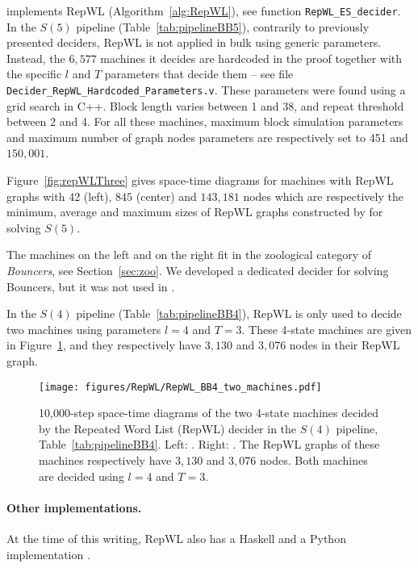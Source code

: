 

\CoqBB implements RepWL (Algorithm~\ref{alg:RepWL}), see function \texttt{RepWL\_ES\_decider}. In the $S(5)$ pipeline (Table~\ref{tab:pipelineBB5}), contrarily to previously presented deciders, RepWL is not applied in bulk using generic parameters. Instead, the ${6,577}$ machines it decides are hardcoded in the proof together with the specific $l$ and $T$ parameters that decide them -- see file \texttt{Decider\_RepWL\_Hardcoded\_Parameters.v}. These parameters were found using a grid search in C++. Block length varies between 1 and 38, and repeat threshold between 2 and 4. For all these machines, maximum block simulation parameters and maximum number of graph nodes parameters are respectively set to 451 and ${150,001}$.


Figure~\ref{fig:repWLThree} gives space-time diagrams for machines with RepWL graphs with 42 (left), ${845}$ (center) and $143{,}181$ nodes which are respectively the minimum, average and maximum sizes of RepWL graphs constructed by \CoqBB for solving $S(5)$.

The machines on the left and on the right fit in the zoological category of \textit{Bouncers}, see Section~\ref{sec:zoo}. We developed a dedicated decider for solving Bouncers, but it was not used in \CoqBB \cite{bbchallenge_part1}.

In the $S(4)$ pipeline (Table~\ref{tab:pipelineBB4}), RepWL is only used to decide two machines using parameters $l=4$ and $T=3$. These 4-state machines are given in Figure~\ref{fig:RepWLBB4}, and they respectively have $3{,}130$ and $3{,}076$ nodes in their RepWL graph.

\begin{figure}
    \centering
    \texttt{[image: figures/RepWL/RepWL\_BB4\_two\_machines.pdf]}
    \caption{10,000-step space-time diagrams of the two 4-state machines decided by the Repeated Word List (RepWL) decider in the $S(4)$ pipeline, Table~\ref{tab:pipelineBB4}. Left: {\small {}}. Right: {\small {}}. The RepWL graphs of these machines respectively have $3{,}130$ and $3{,}076$ nodes. Both machines are decided using $l=4$ and $T=3$.
    }\label{fig:RepWLBB4}
\end{figure}

\paragraph{Other implementations.} At the time of this writing, RepWL also has a Haskell and a Python implementation \cite{RepWL_haskell,RepWL_python}.